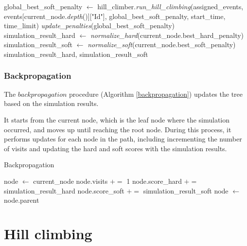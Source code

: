 \begin{algorithm}
\begin{algorithmic}[1]
            \State global\_best\_soft\_penalty $\gets$ hill\_climber.\textit{run\_hill\_climbing}(assigned\_events, 
            \Statex \hspace{3cm} events[current\_node.\textit{depth}()]["Id"], 
            \Statex \hspace{3cm} global\_best\_soft\_penalty, start\_time, time\_limit)
            \State \textit{update\_penalties}(global\_best\_soft\_penalty)
        \EndIf
    \EndIf
    \\
    \State simulation\_result\_hard $\gets$ \textit{normalize\_hard}(current\_node.best\_hard\_penalty)
    \State simulation\_result\_soft $\gets$ \textit{normalize\_soft}(current\_node.best\_soft\_penalty)
    \\
    \State \Return simulation\_result\_hard, simulation\_result\_soft
\EndFunction
\end{algorithmic}
\end{algorithm}

\subsubsection{Backpropagation}

The \(backpropagation\) procedure (Algorithm \ref{backpropagation}) updates the tree based on the simulation results. 

It starts from the current node, which is the leaf node where the simulation occurred, and moves up until reaching the root node. During this process, it performs updates for each node in the path, including incrementing the number of visits and updating the hard and soft scores with the simulation results. 

\begin{algorithm}
\caption{Backpropagation}\label{backpropagation}
\begin{algorithmic}[1]
    \State node $\gets$ current\_node
        \State node.visits $+=$ 1
        \State node.score\_hard $+=$ simulation\_result\_hard
        \State node.score\_soft $+=$ simulation\_result\_soft
        \State node $\gets$ node.parent
    \EndWhile
\EndFunction
\end{algorithmic}
\end{algorithm}


\section{Hill climbing}\label{hill_climbing_section}

